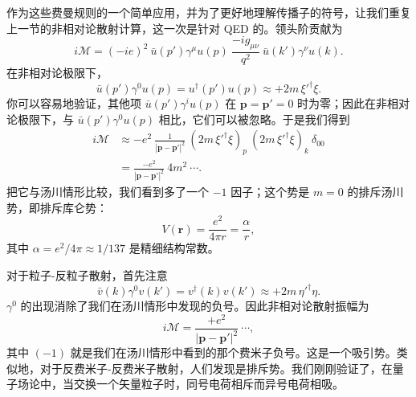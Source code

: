 作为这些费曼规则的一个简单应用，并为了更好地理解传播子的符号，让我们重复上一节的非相对论散射计算，这一次是针对 QED 的。领头阶贡献为
\begin{equation}
  i\mathcal{M} = (-ie)^2\ \bar{u}(p')\gamma^\mu u(p)\
    \frac{-ig_{\mu\nu}}{q^2}\ \bar{u}(k')\gamma^\nu u(k) .
  \label{eq:4.133b}
\end{equation}
在非相对论极限下，
\begin{equation}
  \bar{u}(p')\gamma^0 u(p) = u^{\dagger}(p')u(p) \approx +2m\,\xi'^{\dagger}\xi .
\end{equation}
你可以容易地验证，其他项 $\bar{u}(p')\gamma^i u(p)$ 在 $\mathbf{p} = \mathbf{p}' = 0$ 时为零；因此在非相对论极限下，与 $\bar{u}(p')\gamma^0 u(p)$ 相比，它们可以被忽略。于是我们得到
\begin{equation}
  \begin{aligned}
    i\mathcal{M} &\approx -e^2\ \frac{1}{|\mathbf{p}-\mathbf{p}'|^2}\
      (2m\,\xi'^{\dagger}\xi)_p\ (2m\,\xi'^{\dagger}\xi)_k\ \delta_{00}\\
    &= \frac{-e^2}{|\mathbf{p}-\mathbf{p}'|^2}\ 4m^2\ \cdots .
  \end{aligned}
  \label{eq:4.134}
\end{equation}
把它与汤川情形比较，我们看到多了一个 $-1$ 因子；这个势是 $m=0$ 的排斥汤川势，即排斥库仑势：
\begin{equation}
  V(\mathbf{r}) = \frac{e^2}{4\pi r} = \frac{\alpha}{r},
  \label{eq:4.135}
\end{equation}
其中 $\alpha = e^2/4\pi \approx 1/137$ 是精细结构常数。

对于粒子-反粒子散射，首先注意
\begin{equation}
  \bar{v}(k)\gamma^0 v(k') = v^{\dagger}(k)v(k') \approx +2m\,\eta'^{\dagger}\eta .
\end{equation}
$\gamma^0$ 的出现消除了我们在汤川情形中发现的负号。因此非相对论散射振幅为
\begin{equation}
  i\mathcal{M} = \frac{+e^2}{|\mathbf{p}-\mathbf{p}'|^2}\ \cdots ,
\end{equation}
其中 $(-1)$ 就是我们在汤川情形中看到的那个费米子负号。这是一个吸引势。类似地，对于反费米子-反费米子散射，人们发现是排斥势。我们刚刚验证了，在量子场论中，当交换一个矢量粒子时，同号电荷相斥而异号电荷相吸。

